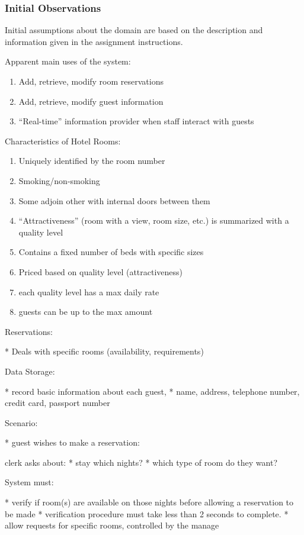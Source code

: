 \subsubsection{Initial Observations}
Initial assumptions about the domain are based on the description and
information given in the assignment instructions.


Apparent main uses of the system:

\begin{enumerate}
  \item Add, retrieve, modify room reservations
  \item Add, retrieve, modify guest information
  \item ``Real-time'' information provider when staff interact with guests
\end{enumerate}



Characteristics of Hotel Rooms:

\begin{enumerate}
\item Uniquely identified by the room number
\item Smoking/non-smoking
\item Some adjoin other with internal doors between them
\item ``Attractiveness'' (room with a view, room size, etc.) is summarized with a quality level 
\item Contains a fixed number of beds with specific sizes
\item Priced based on quality level (attractiveness)
  \item each quality level has a max daily rate
  \item guests can be up to the max amount
\end{enumerate}

Reservations:

* Deals with specific rooms (availability, requirements)


Data Storage:

* record basic information about each guest, 
    * name, address, telephone number, credit card, passport number


Scenario:

* guest wishes to make a reservation:

  clerk asks about:
      * stay which nights?
      * which type of room do they want?

  System must:

    * verify if room(s) are available on those nights before allowing a reservation to be made
    * verification procedure must take less than 2 seconds to complete.
    * allow requests for specific rooms, controlled by the manage

